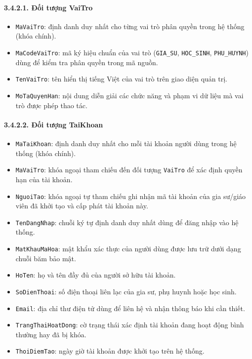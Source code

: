 \documentclass[12pt,a4paper]{article}
\begin{document}
\paragraph{3.4.2.1. Đối tượng VaiTro}\mbox{}
\begin{itemize}\setlength{\itemsep}{2pt}\setlength{\parskip}{0pt}
    \item \texttt{MaVaiTro}: định danh duy nhất cho từng vai trò phân quyền trong hệ thống (khóa chính).
    \item \texttt{MaCodeVaiTro}: mã ký hiệu chuẩn của vai trò (\texttt{GIA\_SU}, \texttt{HOC\_SINH}, \texttt{PHU\_HUYNH}) dùng để kiểm tra phân quyền trong mã nguồn.
    \item \texttt{TenVaiTro}: tên hiển thị tiếng Việt của vai trò trên giao diện quản trị.
    \item \texttt{MoTaQuyenHan}: nội dung diễn giải các chức năng và phạm vi dữ liệu mà vai trò được phép thao tác.
\end{itemize}

\paragraph{3.4.2.2. Đối tượng TaiKhoan}\mbox{}
\begin{itemize}\setlength{\itemsep}{2pt}\setlength{\parskip}{0pt}
    \item \texttt{MaTaiKhoan}: định danh duy nhất cho mỗi tài khoản người dùng trong hệ thống (khóa chính).
    \item \texttt{MaVaiTro}: khóa ngoại tham chiếu đến đối tượng \texttt{VaiTro} để xác định quyền hạn của tài khoản.
    \item \texttt{NguoiTao}: khóa ngoại tự tham chiếu ghi nhận mã tài khoản của gia sư/giáo viên đã khởi tạo và cấp phát tài khoản này.
    \item \texttt{TenDangNhap}: chuỗi ký tự định danh duy nhất dùng để đăng nhập vào hệ thống.
    \item \texttt{MatKhauMaHoa}: mật khẩu xác thực của người dùng được lưu trữ dưới dạng chuỗi băm bảo mật.
    \item \texttt{HoTen}: họ và tên đầy đủ của người sở hữu tài khoản.
    \item \texttt{SoDienThoai}: số điện thoại liên lạc của gia sư, phụ huynh hoặc học sinh.
    \item \texttt{Email}: địa chỉ thư điện tử dùng để liên hệ và nhận thông báo khi cần thiết.
    \item \texttt{TrangThaiHoatDong}: cờ trạng thái xác định tài khoản đang hoạt động bình thường hay đã bị khóa.
    \item \texttt{ThoiDiemTao}: ngày giờ tài khoản được khởi tạo trên hệ thống.
\end{itemize}
\end{document}
